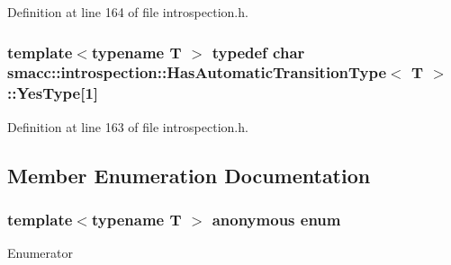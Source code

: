 Definition at line 164 of file introspection.\+h.

\subsubsection[{\texorpdfstring{Yes\+Type}{YesType}}]{\setlength{\rightskip}{0pt plus 5cm}template$<$typename T $>$ typedef char {\bf smacc\+::introspection\+::\+Has\+Automatic\+Transition\+Type}$<$ T $>$\+::Yes\+Type\mbox{[}1\mbox{]}\hspace{0.3cm}{\ttfamily [private]}}\hypertarget{classsmacc_1_1introspection_1_1HasAutomaticTransitionType_abeb599df547eb3db36684b6cb343eade}{}\label{classsmacc_1_1introspection_1_1HasAutomaticTransitionType_abeb599df547eb3db36684b6cb343eade}


Definition at line 163 of file introspection.\+h.



\subsection{Member Enumeration Documentation}
\subsubsection[{\texorpdfstring{anonymous enum}{anonymous enum}}]{\setlength{\rightskip}{0pt plus 5cm}template$<$typename T $>$ anonymous enum}\hypertarget{classsmacc_1_1introspection_1_1HasAutomaticTransitionType_ac663d77745eac0f2b2ceb29e4c8b300b}{}\label{classsmacc_1_1introspection_1_1HasAutomaticTransitionType_ac663d77745eac0f2b2ceb29e4c8b300b}
\begin{Desc}
\item[Enumerator]\par
\begin{description}
\item[{\em 
value\hypertarget{classsmacc_1_1introspection_1_1HasAutomaticTransitionType_ac663d77745eac0f2b2ceb29e4c8b300ba8aba42189dc17891761a49375684776d}{}\label{classsmacc_1_1introspection_1_1HasAutomaticTransitionType_ac663d77745eac0f2b2ceb29e4c8b300ba8aba42189dc17891761a49375684776d}
}]\end{description}
\end{Desc}



